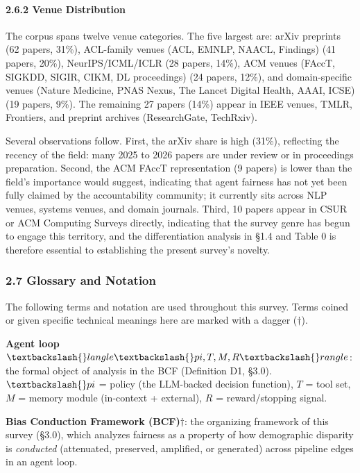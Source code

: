 \documentclass[10pt]{article}
\begin{document}
\paragraph*{2.6.2 Venue Distribution}

The corpus spans twelve venue categories. The five largest are: arXiv preprints (62 papers, 31\%), ACL-family venues (ACL, EMNLP, NAACL, Findings) (41 papers, 20\%), NeurIPS/ICML/ICLR (28 papers, 14\%), ACM venues (FAccT, SIGKDD, SIGIR, CIKM, DL proceedings) (24 papers, 12\%), and domain-specific venues (Nature Medicine, PNAS Nexus, The Lancet Digital Health, AAAI, ICSE) (19 papers, 9\%). The remaining 27 papers (14\%) appear in IEEE venues, TMLR, Frontiers, and preprint archives (ResearchGate, TechRxiv).

Several observations follow. First, the arXiv share is high (31\%), reflecting the recency of the field: many 2025 to 2026 papers are under review or in proceedings preparation. Second, the ACM FAccT representation (9 papers) is lower than the field's importance would suggest, indicating that agent fairness has not yet been fully claimed by the accountability community; it currently sits across NLP venues, systems venues, and domain journals. Third, 10 papers appear in CSUR or ACM Computing Surveys directly, indicating that the survey genre has begun to engage this territory, and the differentiation analysis in \S{}1.4 and Table 0 is therefore essential to establishing the present survey's novelty.


\subsubsection*{2.7 Glossary and Notation}

The following terms and notation are used throughout this survey. Terms coined or given specific technical meanings here are marked with a dagger ($\dagger$).

\textbf{Agent loop} $\textbackslash\{\}langle \textbackslash\{\}pi, T, M, R \textbackslash\{\}rangle$: the formal object of analysis in the BCF (Definition D1, \S{}3.0). $\textbackslash\{\}pi$ = policy (the LLM-backed decision function), $T$ = tool set, $M$ = memory module (in-context + external), $R$ = reward/stopping signal.

\textbf{Bias Conduction Framework (BCF)$\dagger$}: the organizing framework of this survey (\S{}3.0), which analyzes fairness as a property of how demographic disparity is \emph{conducted} (attenuated, preserved, amplified, or generated) across pipeline edges in an agent loop.
\end{document}
